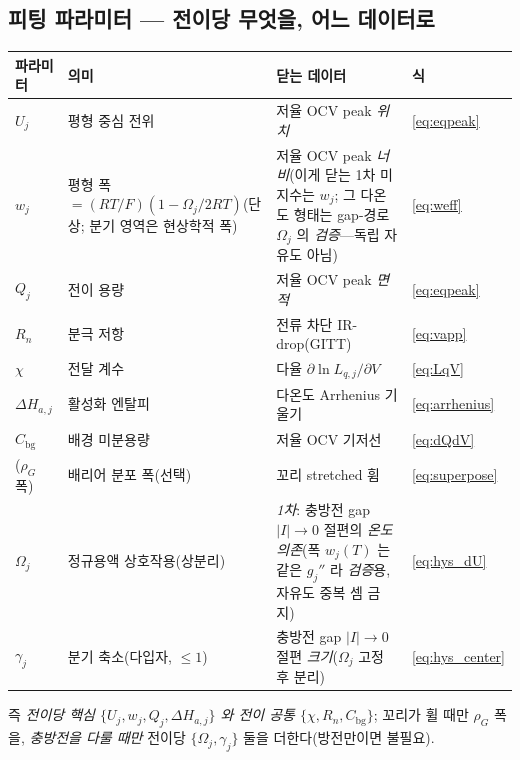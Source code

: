 \documentclass[11pt,a4paper]{article}
\newcommand{\bg}{\mathrm{bg}}
\begin{document}
\subsection{피팅 파라미터 — 전이당 무엇을, 어느 데이터로}
\begin{center}
\renewcommand{\arraystretch}{1.3}
\begin{tabular}{p{} p{} p{} p{}}
\toprule
파라미터 & 의미 & 닫는 데이터 & 식 \\
\midrule
$U_j$ & 평형 중심 전위 & 저율 OCV peak \emph{위치} & \eqref{eq:eqpeak} \\
$w_j$ & 평형 폭 $=(RT/F)(1-\Omega_j/2RT)$(단상; 분기 영역은 현상학적 폭) & 저율 OCV peak \emph{너비}(이게 닫는 1차 미지수는 $w_j$; 그 다온도 형태는 gap-경로 $\Omega_j$ 의 \emph{검증}—독립 자유도 아님) & \eqref{eq:weff} \\
$Q_j$ & 전이 용량 & 저율 OCV peak \emph{면적} & \eqref{eq:eqpeak} \\
$R_n$ & 분극 저항 & 전류 차단 IR-drop(GITT) & \eqref{eq:vapp} \\
$\chi$ & 전달 계수 & 다율 $\partial\ln L_{q,j}/\partial V$ & \eqref{eq:LqV} \\
$\Delta H_{a,j}$ & 활성화 엔탈피 & 다온도 Arrhenius 기울기 & \eqref{eq:arrhenius} \\
$C_\bg$ & 배경 미분용량 & 저율 OCV 기저선 & \eqref{eq:dQdV} \\
($\rho_G$ 폭) & 배리어 분포 폭(선택) & 꼬리 stretched 휨 & \eqref{eq:superpose} \\
$\Omega_j$ & 정규용액 상호작용(상분리) & \emph{1차}: 충방전 gap $|I|\!\to\!0$ 절편의 \emph{온도 의존}(폭 $w_j(T)$ 는 같은 $g_j''$ 라 \emph{검증}용, 자유도 중복 셈 금지) & \eqref{eq:hys_dU} \\
$\gamma_j$ & 분기 축소(다입자, $\le1$) & 충방전 gap $|I|\!\to\!0$ 절편 \emph{크기}($\Omega_j$ 고정 후 분리) & \eqref{eq:hys_center} \\
\bottomrule
\end{tabular}
\end{center}
즉 \emph{전이당 핵심 $\{U_j,w_j,Q_j,\Delta H_{a,j}\}$ 와 전이 공통 $\{\chi,R_n,C_\bg\}$}; 꼬리가 휠 때만 $\rho_G$ 폭을,
\emph{충방전을 다룰 때만} 전이당 $\{\Omega_j,\gamma_j\}$ 둘을 더한다(방전만이면 불필요).
\end{document}
